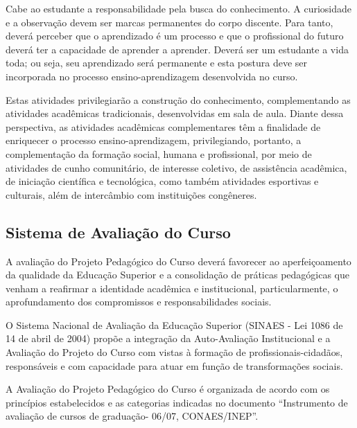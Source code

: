	Cabe ao estudante a responsabilidade pela busca do conhecimento. A curiosidade e a observação devem ser marcas permanentes do corpo discente. Para tanto, deverá perceber que o aprendizado é um processo e que o profissional do futuro deverá ter a capacidade de aprender a aprender. Deverá ser um estudante a vida toda; ou seja, seu aprendizado será permanente e esta postura deve ser incorporada no processo ensino-aprendizagem desenvolvida no curso.
	
Estas atividades privilegiarão a construção do conhecimento, complementando as atividades acadêmicas tradicionais, desenvolvidas em sala de aula. Diante dessa perspectiva, as atividades acadêmicas complementares têm a finalidade de enriquecer o processo ensino-aprendizagem, privilegiando, portanto, a complementação da formação social, humana e profissional, por meio de atividades de cunho comunitário, de interesse coletivo, de assistência acadêmica, de iniciação científica e tecnológica, como também atividades esportivas e culturais, além de intercâmbio com instituições congêneres.

\subsection{Sistema de Avalia\c{c}\~ao do Curso}

A avaliação do Projeto Pedagógico do Curso deverá favorecer ao aperfeiçoamento da qualidade da Educação Superior e a consolidação de práticas pedagógicas que venham a reafirmar a identidade acadêmica e institucional, particularmente, o aprofundamento dos compromissos e responsabilidades sociais.

O Sistema Nacional de Avaliação da Educação Superior (SINAES - Lei 1086 de 14 de abril de 2004) propõe a integração da Auto-Avaliação Institucional e a Avaliação do Projeto do Curso com vistas à formação de profissionais-cidadãos, responsáveis e com capacidade para atuar em função de transformações sociais.

A Avaliação do Projeto Pedagógico do Curso é organizada de acordo com os princípios estabelecidos e as categorias indicadas no documento “Instrumento de avaliação de cursos de graduação- 06/07, CONAES/INEP”.

